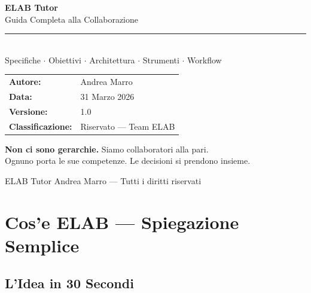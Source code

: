\documentclass[11pt,a4paper]{article}
\begin{document}
\begin{titlepage}
\centering
\vspace*{2cm}

{\Huge\bfseries\textcolor{elabnavy}{ELAB Tutor}}\\[0.4cm]
{\Large\textcolor{elablime}{Guida Completa alla Collaborazione}}\\[1.5cm]

\textcolor{elabnavy}{\rule{12cm}{2pt}}\\[1cm]

{\large\textcolor{elabdark}{Specifiche $\cdot$ Obiettivi $\cdot$ Architettura $\cdot$ Strumenti $\cdot$ Workflow}}\\[2cm]

\begin{tabular}{ll}
\textbf{Autore:} & Andrea Marro \\
\textbf{Data:} & 31 Marzo 2026 \\
\textbf{Versione:} & 1.0 \\
\textbf{Classificazione:} & Riservato --- Team ELAB \\
\end{tabular}

\vfill

\begin{principiobox}
\centering
\textbf{Non ci sono gerarchie.} Siamo collaboratori alla pari.\\
Ognuno porta le sue competenze. Le decisioni si prendono insieme.
\end{principiobox}

\vfill
{\small\textcolor{elabgray}{ELAB Tutor \textcopyright{} Andrea Marro --- Tutti i diritti riservati}}
\end{titlepage}

\tableofcontents
\newpage

\section{Cos'e ELAB --- Spiegazione Semplice}

\subsection{L'Idea in 30 Secondi}
\end{document}
